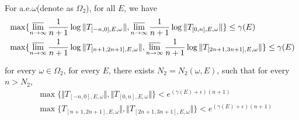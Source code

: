 \begin{thm}
  For a.e.$\omega$(denote as $\Omega_2$), for all $E$, we have
  \[
    \begin{aligned}
      &\max\{\varlimsup_{n\to\infty} \frac{1}{n+1} \log\Vert T_{[-n,0],E,\omega}\Vert, \varlimsup_{n\to\infty} \frac{1}{n+1} \log\Vert T_{[0,n],E,\omega}\Vert\}\leq\gamma(E)\\
      &\max\{\varlimsup_{n\to\infty} \frac{1}{n+1}\log\Vert T_{[n+1,2n+1],E,\omega}\Vert, \varlimsup_{n\to\infty} \frac{1}{n+1} \log\Vert T_{[2n+1,3n+1],E,\omega}\Vert\}\leq\gamma(E)
      \end{aligned}
  \]
\end{thm}
\begin{cor}\label{omega2}
  for every $ \omega\in\Omega_2$, for every $E$, there exists $N_2=N_2(\omega,E)$, such that for every $ n>N_2$,
\[
\begin{aligned}
&\max\{\Vert T_{[-n,0],E,\omega}\Vert, \Vert T_{[0,n],E,\omega}\Vert\}<e^{(\gamma(E)+\epsilon)(n+1)}\\ &\max\{T_{[n+1,2n+1],E,\omega}\Vert, \Vert T_{[2n+1,3n+1],E,\omega}\Vert\}<e^{(\gamma(E)+\epsilon)(n+1)}
\end{aligned}
\]

\end{cor}
